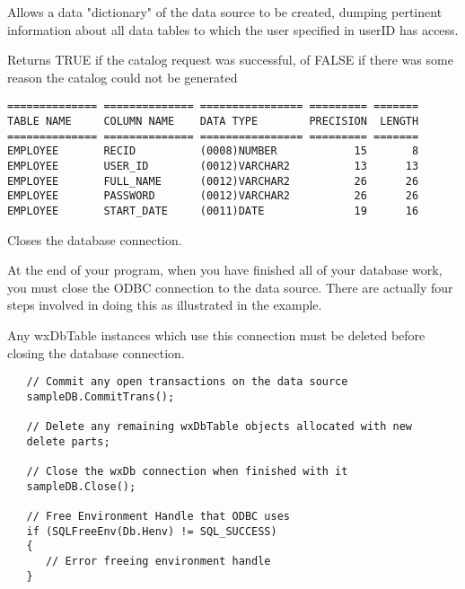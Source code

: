 
Allows a data "dictionary" of the data source to be created, dumping pertinent information about all data tables to which the user specified in userID has access. 





Returns TRUE if the catalog request was successful, of FALSE if there was some reason the catalog could not be generated


\begin{verbatim}
============== ============== ================ ========= =======
TABLE NAME     COLUMN NAME    DATA TYPE        PRECISION  LENGTH
============== ============== ================ ========= =======
EMPLOYEE       RECID          (0008)NUMBER            15       8
EMPLOYEE       USER_ID        (0012)VARCHAR2          13      13
EMPLOYEE       FULL_NAME      (0012)VARCHAR2          26      26
EMPLOYEE       PASSWORD       (0012)VARCHAR2          26      26
EMPLOYEE       START_DATE     (0011)DATE              19      16
\end{verbatim}


\label{wxdbclose}


Closes the database connection.


At the end of your program, when you have finished all of your database work, you must close the ODBC connection to the data source.  There are actually four steps involved in doing this as illustrated in the example.  

Any wxDbTable instances which use this connection must be deleted before closing the database connection.

\begin{verbatim}
   // Commit any open transactions on the data source
   sampleDB.CommitTrans();

   // Delete any remaining wxDbTable objects allocated with new
   delete parts;

   // Close the wxDb connection when finished with it
   sampleDB.Close();

   // Free Environment Handle that ODBC uses
   if (SQLFreeEnv(Db.Henv) != SQL_SUCCESS)
   {
      // Error freeing environment handle
   }
\end{verbatim}


